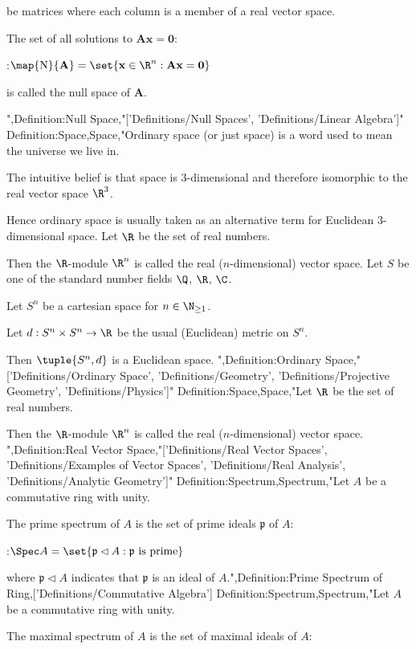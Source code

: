 be matrices where each column is a member of a real vector space.

The set of all solutions to $\mathbf A \mathbf x = \mathbf 0$:

:$\map {\mathrm N} {\mathbf A} = \set {\mathbf x \in \R^n : \mathbf {A x} = \mathbf 0}$

is called the null space of $\mathbf A$.



",Definition:Null Space,"['Definitions/Null Spaces', 'Definitions/Linear Algebra']"
Definition:Space,Space,"Ordinary space (or just space) is a word used to mean the universe we live in.

The intuitive belief is that space is $3$-dimensional and therefore isomorphic to the real vector space $\R^3$.


Hence ordinary space is usually taken as an alternative term for Euclidean $3$-dimensional space.
Let $\R$ be the set of real numbers.


Then the $\R$-module $\R^n$ is called the real ($n$-dimensional) vector space.
Let $S$ be one of the standard number fields $\Q$, $\R$, $\C$.

Let $S^n$ be a cartesian space for $n \in \N_{\ge 1}$.

Let $d: S^n \times S^n \to \R$ be the usual (Euclidean) metric on $S^n$.

Then $\tuple {S^n, d}$ is a Euclidean space.
",Definition:Ordinary Space,"['Definitions/Ordinary Space', 'Definitions/Geometry', 'Definitions/Projective Geometry', 'Definitions/Physics']"
Definition:Space,Space,"Let $\R$ be the set of real numbers.


Then the $\R$-module $\R^n$ is called the real ($n$-dimensional) vector space.
",Definition:Real Vector Space,"['Definitions/Real Vector Spaces', 'Definitions/Examples of Vector Spaces', 'Definitions/Real Analysis', 'Definitions/Analytic Geometry']"
Definition:Spectrum,Spectrum,"Let $A$ be a commutative ring with unity.


The prime spectrum of $A$ is the set of prime ideals $\mathfrak p$ of $A$:

:$\Spec A = \set {\mathfrak p \lhd A: \mathfrak p \text{ is prime} }$

where $\mathfrak p \lhd A$ indicates that $\mathfrak p$ is an ideal of $A$.",Definition:Prime Spectrum of Ring,['Definitions/Commutative Algebra']
Definition:Spectrum,Spectrum,"Let $A$ be a commutative ring with unity.


The maximal spectrum of $A$ is the set of maximal ideals of $A$:

